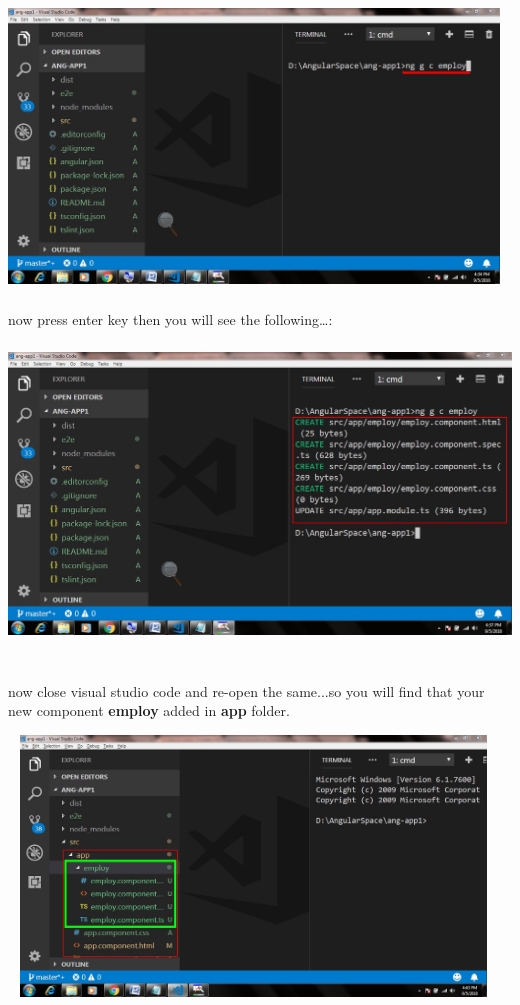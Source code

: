\documentclass{article}
\begin{document}
\begin{center}
	\noindent \includegraphics*[width=5.12in, height=3.04in]{IMG-02-06}
\end{center}

\noindent 
\newpage


\noindent now press enter key then you will see the following{\dots}:

\begin{center}
	\noindent \includegraphics*[width=5.55in, height=3.12in]{IMG-02-07}
\end{center}

\noindent 

\noindent \\ now close visual studio code and re-open the same...so you will find that your new component \textbf{employ} added in \textbf{app} folder.

\begin{center}
	\noindent \includegraphics*[width=5.12in, height=2.73in, trim=0.00in 0.15in 0.00in 0.00in]{IMG-02-08}
\end{center}
\end{document}
